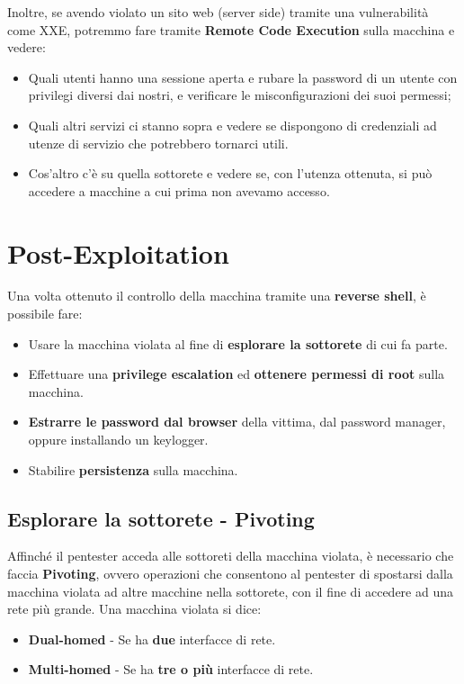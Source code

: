 \documentclass{article}
\begin{document}
Inoltre, se avendo violato un sito web (server side) tramite una vulnerabilità come XXE, potremmo fare tramite \textbf{Remote Code Execution} sulla macchina e vedere:
\begin{itemize}
	\item Quali utenti hanno una sessione aperta e rubare la password di un utente con privilegi diversi dai nostri, e verificare le misconfigurazioni dei suoi permessi;
	
	\item Quali altri servizi ci stanno sopra e vedere se dispongono di credenziali ad utenze di servizio che potrebbero tornarci utili.
	
	\item Cos’altro c’è su quella sottorete e vedere se, con l'utenza ottenuta, si può accedere a macchine a cui prima non avevamo accesso.	
\end{itemize}

\newpage
\section{Post-Exploitation}
Una volta ottenuto il controllo della macchina tramite una \textbf{reverse shell}, è possibile fare:
\begin{itemize}
	\item Usare la macchina violata al fine di \textbf{esplorare la sottorete} di cui fa parte.
	\item Effettuare una \textbf{privilege escalation} ed \textbf{ottenere permessi di root} sulla macchina.
	\item \textbf{Estrarre le password dal browser} della vittima, dal password manager, oppure installando un keylogger.
	\item Stabilire \textbf{persistenza} sulla macchina.
\end{itemize}

\subsection{Esplorare la sottorete - Pivoting}
Affinché il pentester acceda alle sottoreti della macchina violata, è necessario che faccia \textbf{Pivoting}, ovvero operazioni che consentono al pentester di spostarsi dalla macchina violata ad altre macchine nella sottorete, con il fine di accedere ad una rete più grande. Una macchina violata si dice:
\begin{itemize}
	\item \textbf{Dual-homed} - Se ha \textbf{due} interfacce di rete.
	\item \textbf{Multi-homed} - Se ha \textbf{tre o più} interfacce di rete.
\end{itemize}
\end{document}
